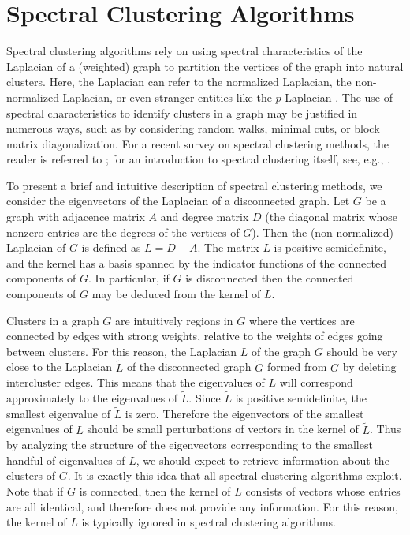 \documentclass[10pt,journal,compsoc]{IEEEtran} %
\theoremstyle{definition}
\newcommand{\wt}[1]{\widetilde{#1}}
\begin{document}
\section{Spectral Clustering Algorithms} Spectral clustering
algorithms rely on using spectral characteristics of the Laplacian of
a (weighted) graph to partition the vertices of the graph into natural
clusters.  Here, the Laplacian can refer to the normalized Laplacian,
the non-normalized Laplacian, or even stranger entities like the
$p$-Laplacian \cite{buhler2009spectral}.  The use of spectral
characteristics to identify clusters in a graph may be justified in
numerous ways, such as by considering random walks, minimal cuts, or
block matrix diagonalization.  For a recent survey on spectral
clustering methods, the reader is referred to
\cite{nascimento2011spectral}; for an introduction to spectral
clustering itself, see, e.g., \cite{von2007tutorial}.

To present a brief and intuitive description of spectral clustering
methods, we consider the eigenvectors of the Laplacian of a
disconnected graph.  Let $G$ be a graph with adjacence matrix $A$ and
degree matrix $D$ (the diagonal matrix whose nonzero entries are the
degrees of the vertices of $G$).  Then the (non-normalized) Laplacian
of $G$ is defined as $L=D-A$.  The matrix $L$ is positive
semidefinite, and the kernel has a basis spanned by the indicator
functions of the connected components of $G$.  In particular, if $G$
is disconnected then the connected components of $G$ may be deduced
from the kernel of $L$.

Clusters in a graph $G$ are intuitively regions in $G$ where the vertices are
connected by edges with strong weights, relative to the weights of edges going
between clusters.  For this reason, the Laplacian $L$ of the graph $G$ should
be very close to the Laplacian $\wt L$ of the disconnected graph $\wt G$ formed
from $G$ by deleting intercluster edges.  This means that the eigenvalues of $L$
will correspond approximately to the eigenvalues of $\wt L$.  Since $\wt L$ is
positive semidefinite, the smallest eigenvalue of $\wt L$ is zero.  Therefore
the eigenvectors of the smallest eigenvalues of $L$ should be small
perturbations of vectors in the kernel of $\wt L$.  Thus by analyzing the
structure of the eigenvectors corresponding to the smallest handful of
eigenvalues of $L$, we should expect to retrieve information about the clusters
of $G$.  It is exactly this idea that all spectral clustering algorithms
exploit.  Note that if $G$ is connected, then the kernel of $L$ consists of
vectors whose entries are all identical, and therefore does not provide any
information.  For this reason, the kernel of $L$ is typically ignored in
spectral clustering algorithms.
\end{document}
